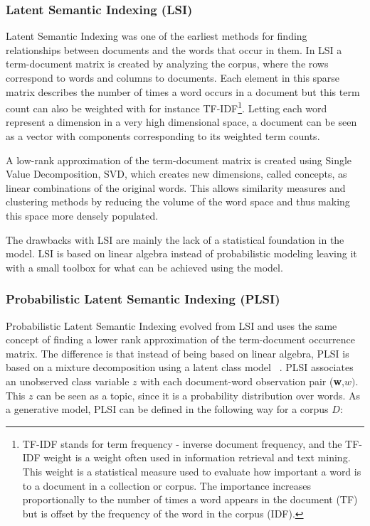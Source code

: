 \documentclass[12pt]{report}
\begin{document}
\subsubsection{Latent Semantic Indexing (LSI)}

Latent Semantic Indexing was one of the earliest methods for finding
relationships between documents and the words that occur in
them\cite{Deerwester90indexingby}. In LSI a term-document matrix is
created by analyzing the corpus, where the rows correspond to words
and columns to documents. Each element in this sparse matrix describes
the number of times a word occurs in a document but this term count
can also be weighted with for instance TF-IDF\footnote{TF-IDF stands 
for term frequency - inverse document frequency, and the TF-IDF weight is 
a weight often used in information retrieval and text mining. This weight 
is a statistical measure used to evaluate how important a word is to 
a document in a collection or corpus. The importance increases
proportionally to the number of times a word appears in the document (TF) but
is offset by the frequency of the word in the corpus (IDF).}. Letting
each word represent a dimension in a very high dimensional space, a
document can be seen as a vector with components corresponding to its
weighted term counts\cite{Salton:1988:TAA:54259.54260}.

A low-rank approximation of the term-document matrix is created using Single
Value Decomposition, SVD, which creates new dimensions, called concepts, as
linear combinations of the original words. This allows similarity measures and
clustering methods by reducing the volume of the word space and thus making
this space more densely populated.

The drawbacks with LSI are mainly the lack of a statistical foundation in the
model. LSI is based on linear algebra instead of probabilistic modeling leaving
it with a small toolbox for what can be achieved using the model.

\subsubsection{Probabilistic Latent Semantic Indexing (PLSI)}

Probabilistic Latent Semantic Indexing evolved from LSI and uses the same
concept of finding a lower rank approximation of the term-document occurrence
matrix. The difference is that instead of being based on linear algebra, PLSI
is based on a mixture decomposition using a latent class model
~\cite{Hofmann:1999:PLS:312624.312649}. PLSI associates an unobserved class 
variable $z$ with each document-word observation pair (\textbf{w},$
w)$. This $z$ can be seen as a topic, since it is a probability distribution
over words. As a generative model, PLSI can be defined in the following way 
for a corpus $D$:
\end{document}
